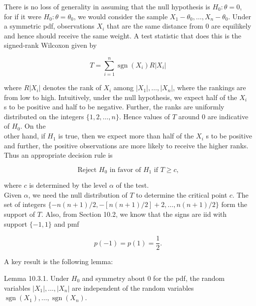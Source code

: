 There is no loss of generality in assuming that the null hypothesis is $H_{0}: \theta=0$, for if it were $H_{0}: \theta=\theta_{0}$, we would consider the sample $X_{1}-\theta_{0}, \ldots, X_{n}-\theta_{0}$. Under a symmetric pdf, observations $X_{i}$ that are the same distance from 0 are equilikely and hence should receive the same weight. A test statistic that does this is the signed-rank Wilcoxon given by


\begin{equation*}
T=\sum_{i=1}^{n} \operatorname{sgn}\left(X_{i}\right) R\left|X_{i}\right| \tag{10.3.2}
\end{equation*}


where $R\left|X_{i}\right|$ denotes the rank of $X_{i}$ among $\left|X_{1}\right|, \ldots,\left|X_{n}\right|$, where the rankings are from low to high. Intuitively, under the null hypothesis, we expect half of the $X_{i}$ s to be positive and half to be negative. Further, the ranks are uniformly distributed on the integers $\{1,2, \ldots, n\}$. Hence values of $T$ around 0 are indicative of $H_{0}$. On the\\
other hand, if $H_{1}$ is true, then we expect more than half of the $X_{i}$ s to be positive and further, the positive observations are more likely to receive the higher ranks. Thus an appropriate decision rule is


\begin{equation*}
\text { Reject } H_{0} \text { in favor of } H_{1} \text { if } T \geq c \text {, } \tag{10.3.3}
\end{equation*}


where $c$ is determined by the level $\alpha$ of the test.\\
Given $\alpha$, we need the null distribution of $T$ to determine the critical point $c$. The set of integers $\{-n(n+1) / 2,-[n(n+1) / 2]+2, \ldots, n(n+1) / 2\}$ form the support of $T$. Also, from Section 10.2, we know that the signs are iid with support $\{-1,1\}$ and pmf


\begin{equation*}
p(-1)=p(1)=\frac{1}{2} . \tag{10.3.4}
\end{equation*}


A key result is the following lemma:

Lemma 10.3.1. Under $H_{0}$ and symmetry about 0 for the pdf, the random variables $\left|X_{1}\right|, \ldots,\left|X_{n}\right|$ are independent of the random variables $\operatorname{sgn}\left(X_{1}\right), \ldots, \operatorname{sgn}\left(X_{n}\right)$.

